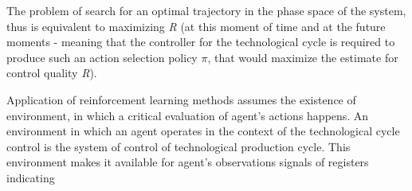 \documentclass{article}
\begin{document}
\begin{minipage}[t]{0.45\textwidth}
    \hspace{0.2cm} The problem of search for an optimal trajectory in the phase space of the system, thus is equivalent to maximizing \textit{R} (at this moment of time and at the future moments - meaning that the controller for the technological cycle is required to produce such an action selection policy $\pi$, that would maximize the estimate for control quality \textit{R}).

    \hspace{0.2cm} Application of reinforcement learning methods assumes the existence of environment, in which a critical evaluation of agent’s actions happens. An environment in which an agent operates in the context of the technological cycle control is the system of control of technological production cycle. This environment makes it available for agent’s observations signals of registers indicating

\end{minipage}
\end{document}
